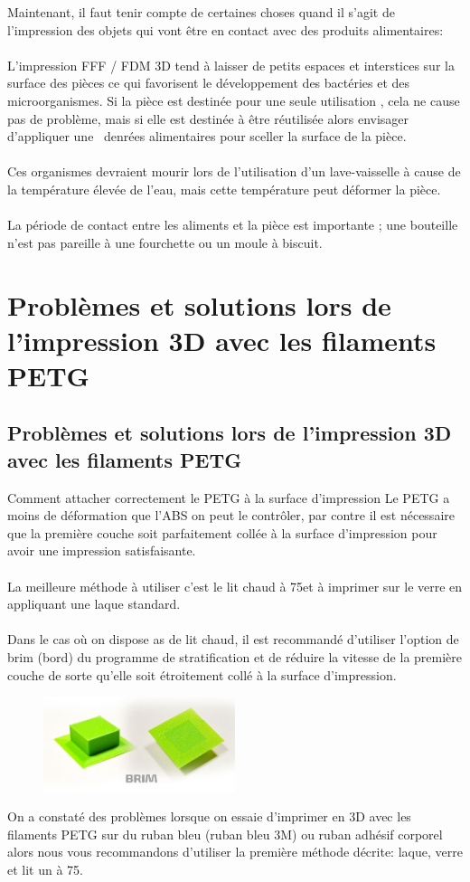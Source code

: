 \documentclass[11pt,a4paper]{article}
\begin{document}
Maintenant, il faut tenir compte de certaines choses quand il s’agit de l’impression des objets qui vont être en contact avec des produits alimentaires:
\\\\
L'impression FFF / FDM 3D tend à laisser de petits espaces et interstices sur la surface des pièces ce qui favorisent le développement des bactéries et des microorganismes. Si la pièce est destinée pour une seule utilisation , cela ne cause pas de problème, mais si elle est destinée à être réutilisée alors envisager d’appliquer une  denrées alimentaires pour sceller la surface de la pièce.
\\\\
Ces organismes devraient mourir lors de l’utilisation d’un lave-vaisselle à cause de la température élevée de l’eau, mais cette température peut déformer la pièce.
\\\\
La période de contact entre les aliments et la pièce est importante ; une bouteille n’est pas pareille à une fourchette ou un moule à biscuit.
\section{Problèmes et solutions lors de l’impression 3D avec les filaments PETG}
	\subsection{Problèmes et solutions lors de l’impression 3D avec les filaments PETG}Comment attacher correctement le PETG à la surface d'impression  Le PETG a moins de déformation que l’ABS on peut le contrôler, par contre il est nécessaire que la première couche soit parfaitement collée à la surface d’impression pour avoir une impression satisfaisante.
\\\\
La meilleure méthode à utiliser c’est le lit chaud à 75\degree et à imprimer sur le verre en appliquant une laque standard.
\\\\
Dans le cas où on dispose as de lit chaud, il est recommandé d’utiliser l’option de brim (bord) du programme de stratification et de réduire la vitesse de la première couche de sorte qu’elle soit étroitement collé à la surface d’impression.
\begin{figure}[H]
\centering
\includegraphics[width=0.5\textwidth,cfbox=azul_marcos 1pt 0pt]{FOTOS/BRIM}
\end{figure}
On a constaté des problèmes lorsque on essaie d’imprimer en 3D avec les filaments PETG sur du ruban bleu (ruban bleu 3M) ou ruban adhésif corporel alors nous vous recommandons d’utiliser la première méthode décrite: laque, verre et lit un à 75\degree.
\end{document}
